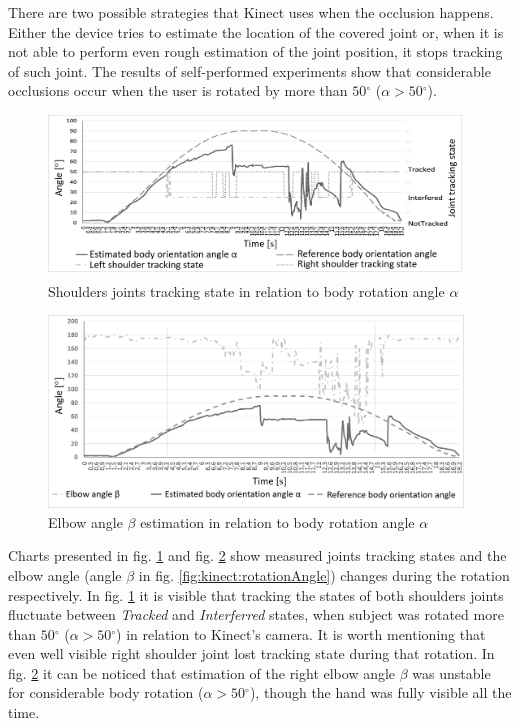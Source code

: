 \documentclass[sensors,article,submit,moreauthors,pdftex,10pt,a4paper]{mdpi}
\newcommand{\degree}{\ensuremath{{}^{\circ}}\xspace}
\begin{document}
	There are two possible strategies that Kinect uses when the occlusion happens. Either the device tries to estimate the location of the covered joint or, when it is not able to perform even rough estimation of the joint position, it stops tracking of such joint. The results of self-performed experiments show that considerable occlusions occur when the user is rotated by more than $50\degree$ ($\alpha > 50\degree$). 
	
	\begin{figure}[H] %
		\centering
		\includegraphics[width=11cm]{Figure4.png}
		\caption{Shoulders joints tracking state in relation to body rotation angle $\alpha$}
		\label{fig:kinect:trackingVsAlpha}
	\end{figure}
	
	\begin{figure}[H] %
		\centering
		\includegraphics[width=11cm]{Figure5.png}
		\caption{Elbow angle $\beta$ estimation in relation to body rotation angle $\alpha$}
		\label{fig:kinect:betaVsAlpha}
	\end{figure}
	
	Charts presented in fig. \ref{fig:kinect:trackingVsAlpha} and fig. \ref{fig:kinect:betaVsAlpha} show measured joints tracking states and the elbow angle (angle $\beta$ in fig. \ref{fig:kinect:rotationAngle}) changes during the rotation respectively. In fig. \ref{fig:kinect:trackingVsAlpha} it is visible that tracking the states of both shoulders joints fluctuate between \emph{Tracked} and \emph{Interferred} states, when subject was rotated more than $50\degree$ ($\alpha > 50\degree$) in relation to Kinect’s camera. It is worth mentioning that even well visible right shoulder joint lost tracking state during that rotation. In fig. \ref{fig:kinect:betaVsAlpha} it can be noticed that estimation of the right elbow angle $\beta$ was unstable for considerable body rotation ($\alpha > 50\degree$), though the hand was fully visible all the time.
	
\end{document}

